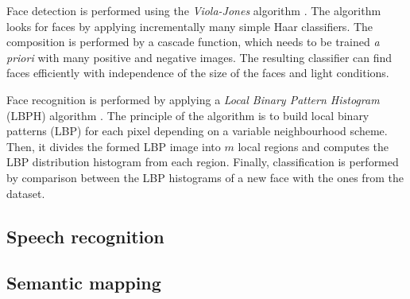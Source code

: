 Face detection is performed using the \textit{Viola-Jones} algorithm \cite{Viola01_RapidObjDet}. The algorithm looks for faces by applying incrementally many simple Haar classifiers. The composition is performed by a cascade function, which needs to be trained \textit{a priori} with many positive and negative images. The resulting classifier can find faces efficiently with independence of the size of the faces and light conditions.

Face recognition is performed by applying a \textit{Local Binary Pattern Histogram} (LBPH) algorithm \cite{Ahonen04_FaceRecLBP}. The principle of the algorithm is to build local binary patterns (LBP) for each pixel depending on a variable neighbourhood scheme. Then, it divides the formed LBP image into $m$ local regions and computes the LBP distribution histogram from each region. Finally, classification is performed by comparison between the LBP histograms of a new face with the ones from the dataset.


\subsection{Speech recognition}

\subsection{Semantic mapping}







